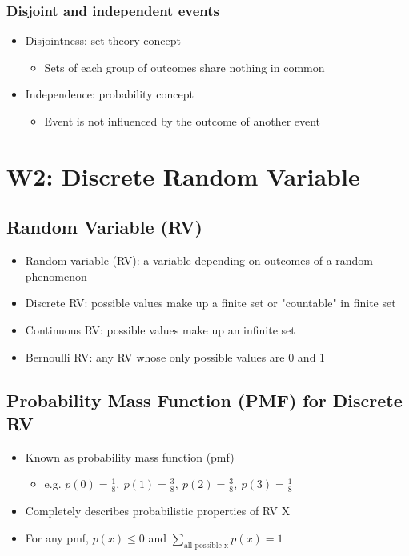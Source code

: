 \documentclass[a4paper]{article}
\begin{document}
\subsubsection{Disjoint and independent events}
\begin{itemize}
    \item Disjointness: set-theory concept
    \begin{itemize}[label=$\circ$]
        \item Sets of each group of outcomes share nothing in common
    \end{itemize}
    \item Independence: probability concept
    \begin{itemize}[label=$\circ$]
        \item Event is not influenced by the outcome of another event
    \end{itemize}
\end{itemize}
\newpage
\section{W2: Discrete Random Variable}
\subsection{Random Variable (RV)}
\begin{itemize}
    \item Random variable (RV): a variable depending on outcomes of a random phenomenon
    \item Discrete RV: possible values make up a finite set or "countable" in finite set
    \item Continuous RV: possible values make up an infinite set
    \item Bernoulli RV: any RV whose only possible values are 0 and 1
\end{itemize}
\subsection{Probability Mass Function (PMF) for Discrete RV}
\begin{itemize}
    \item Known as probability mass function (pmf)
    \begin{itemize}[label=$\circ$]
        \item e.g. $p(0) = \frac{1}{8}, \ p(1) = \frac{3}{8}, \ p(2) = \frac{3}{8}, \ p(3) = \frac{1}{8}$
    \end{itemize}
    \item Completely describes probabilistic properties of RV X
    \item For any pmf, $p(x)\leq 0$ and $\sum_{\text{all possible x}}p(x) = 1$
\end{itemize}
\end{document}
